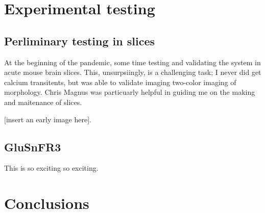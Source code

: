 \documentclass[a4paper,10pt]{article}
\begin{document}
\section{Experimental testing}

\subsection{Perliminary testing in slices}

At the beginning of the pandemic, some time testing and validating the system in acute mouse brain slices.  This, unsurpsiingly, is a challenging task; I never did get  calcium transitents, but was able to validate imaging two-color imaging of morphology. Chris Magnus was particuarly helpful in guiding me on the making and maitenance of slices.  

[insert an early image here].  

\subsection{GluSnFR3}

This is so exciting so exciting. 

\section{Conclusions}
\end{document}
